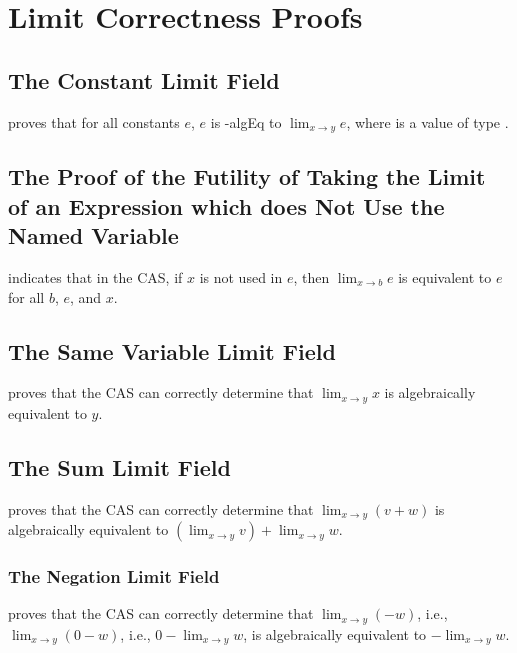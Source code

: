 \documentclass{report}
\begin{document}
\section{Limit Correctness Proofs}

\subsection{The Constant Limit Field}
  proves that for all constants \(e\), \(e\) is -\gls{algEq} to \(\lim_{x \rightarrow y} e\), where  is a value of type  .

\subsection{The Proof of the Futility of Taking the Limit of an Expression which does Not Use the Named Variable}
  indicates that in the  CAS, if \(x\) is not used in \(e\), then \(\lim_{x \rightarrow b} e\) is equivalent to \(e\) for all \(b\), \(e\), and \(x\).

\subsection{The Same Variable Limit Field}
  proves that the  CAS can correctly determine that \(\lim_{x \rightarrow y} x\) is algebraically equivalent to \(y\).

\subsection{The Sum Limit Field}
  proves that the  CAS can correctly determine that \(\lim_{x \rightarrow y} \left(v + w\right)\) is algebraically equivalent to \(\left(\lim_{x \rightarrow y} v\right) + \lim_{x \rightarrow y} w\).

\subsubsection{The Negation Limit Field}
  proves that the  CAS can correctly determine that \(\lim_{x \rightarrow y} \left(- w\right)\), i.e., \(\lim_{x \rightarrow y} \left(0 - w\right)\), i.e., \(0 - \lim_{x \rightarrow y} w\), is algebraically equivalent to \(- \lim_{x \rightarrow y} w\).
\end{document}
